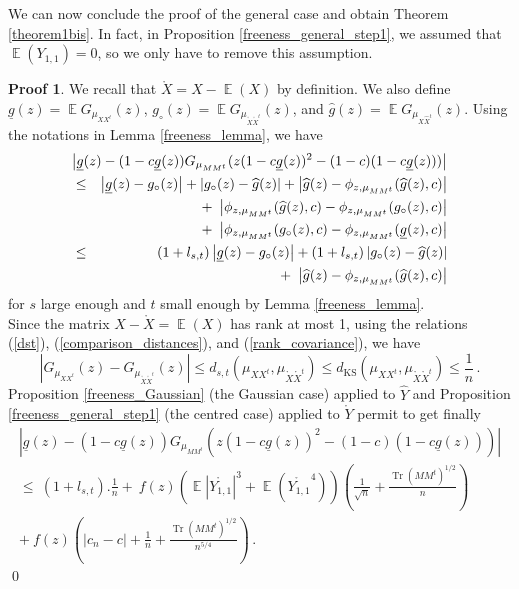 \documentclass[11pt,a4paper]{article}
\DeclareMathOperator{\E}{\mathbb{E}}
\DeclareMathOperator{\1}{\mathbf{1}}
\DeclareMathOperator{\Tr}{\mathrm{Tr}}
\newcommand{\dKS}{d_{\mathrm{KS}}}
\newcommand{\gbar}{\underline{g}}
\newcommand{\Xhat}{\widehat{X}}
\newcommand{\Yhat}{\widehat{Y}}
\theoremstyle{definition}
\newtheorem*{Proof}{Proof}
\begin{document}
We can now conclude the proof of the general case and obtain Theorem \ref{theorem1bis}. In fact, in Proposition \ref{freeness_general_step1}, we assumed that $\E(Y_{1,1}) = 0$, so we only have to remove this assumption.

\begin{Proof}
We recall that $\mathring{X} = X-\E(X)$ by definition. We also define $\gbar(z) = \E G_{\mu_{XX^t}}(z)$, $g_{\circ}(z) = \E G_{\mu_{\mathring{X}\mathring{X}^t}}(z)$, and $\widehat{g}(z) = \E G_{\mu_{\Xhat\Xhat^t}}(z)$. Using the notations in Lemma \ref{freeness_lemma}, we have
\begin{eqnarray*}
\lefteqn{   \left| \gbar(z) - (1-c\gbar(z)) G_{\mu_{MM^t}}(z(1-c\gbar(z))^2-(1-c)(1-c\gbar(z))) \right|   } \\
& \le & \left| \gbar(z) - g_{\circ}(z) \right| + \left| g_{\circ}(z) - \widehat{g}(z) \right| + \left| \widehat{g}(z) - \phi_{z,\mu_{MM^t}}(\widehat{g}(z),c) \right| \\
& & \quad  + \ \left| \phi_{z,\mu_{MM^t}}(\widehat{g}(z),c) - \phi_{z,\mu_{MM^t}}(g_{\circ}(z),c) \right| \\
& & \quad  + \ \left| \phi_{z,\mu_{MM^t}}(g_{\circ}(z),c) - \phi_{z,\mu_{MM^t}}(\gbar(z),c) \right| \\
& \le & (1+l_{s,t}) \left| \gbar(z) - g_{\circ}(z) \right| + (1+l_{s,t}) \left| g_{\circ}(z) - \widehat{g}(z) \right| \\
& & \quad  + \ \left| \widehat{g}(z) - \phi_{z,\mu_{MM^t}}(\widehat{g}(z),c) \right|
\end{eqnarray*}
for $s$ large enough and $t$ small enough by Lemma \ref{freeness_lemma}.\\
Since the matrix $X-\mathring{X} = \E(X)$ has rank at most 1, using the relations (\ref{dst}), (\ref{comparison_distances}), and (\ref{rank_covariance}), we have
\begin{displaymath}
\left| G_{\mu_{XX^t}}(z) - G_{\mu_{\mathring{X}\mathring{X}^t}}(z) \right| \le d_{s,t} \left( \mu_{XX^t} , \mu_{\mathring{X}\mathring{X}^t} \right) \le \dKS \left( \mu_{XX^t} , \mu_{\mathring{X}\mathring{X}^t} \right) \le \frac1n \, .
\end{displaymath}
Proposition \ref{freeness_Gaussian} (the Gaussian case) applied to $\Yhat$ and Proposition \ref{freeness_general_step1} (the centred case) applied to $\mathring{Y}$ permit to get finally
\begin{multline*}
\left| \gbar(z) - (1-c\gbar(z)) G_{\mu_{MM^t}}(z(1-c\gbar(z))^2-(1-c)(1-c\gbar(z))) \right| \\
\le \ (1+l_{s,t}).\frac1n + \ f(z) \left( \E |\mathring{Y_{1,1}}|^3 + \E(\mathring{Y_{1,1}}^4) \right) \left( \frac{1}{\sqrt{n}} + \frac{\Tr(MM^t)^{1/2}}{n} \right) \\
+ \ f(z) \left( |c_n-c| + \frac1n + \frac{\Tr(MM^t)^{1/2}}{n^{5/4}} \right) \, .
\end{multline*} \qed
\end{Proof}
\end{document}

